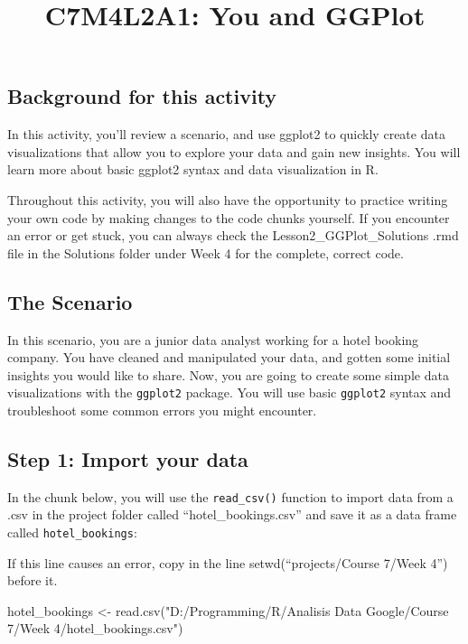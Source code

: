 \documentclass[
]{article}
\title{C7M4L2A1: You and GGPlot}
\author{}
\date{\vspace{-2.5em}}
\newenvironment{Shaded}{\begin{snugshade}}{\end{snugshade}}
\newcommand{\FunctionTok}[1]{\textcolor[rgb]{0.00,0.00,0.00}{#1}}
\newcommand{\NormalTok}[1]{#1}
\newcommand{\OtherTok}[1]{\textcolor[rgb]{0.56,0.35,0.01}{#1}}
\newcommand{\StringTok}[1]{\textcolor[rgb]{0.31,0.60,0.02}{#1}}
\begin{document}
\maketitle

\hypertarget{background-for-this-activity}{%
\subsection{Background for this
activity}\label{background-for-this-activity}}

In this activity, you'll review a scenario, and use ggplot2 to quickly
create data visualizations that allow you to explore your data and gain
new insights. You will learn more about basic ggplot2 syntax and data
visualization in R.

Throughout this activity, you will also have the opportunity to practice
writing your own code by making changes to the code chunks yourself. If
you encounter an error or get stuck, you can always check the
Lesson2\_GGPlot\_Solutions .rmd file in the Solutions folder under Week
4 for the complete, correct code.

\hypertarget{the-scenario}{%
\subsection{The Scenario}\label{the-scenario}}

In this scenario, you are a junior data analyst working for a hotel
booking company. You have cleaned and manipulated your data, and gotten
some initial insights you would like to share. Now, you are going to
create some simple data visualizations with the \texttt{ggplot2}
package. You will use basic \texttt{ggplot2} syntax and troubleshoot
some common errors you might encounter.

\hypertarget{step-1-import-your-data}{%
\subsection{Step 1: Import your data}\label{step-1-import-your-data}}

In the chunk below, you will use the \texttt{read\_csv()} function to
import data from a .csv in the project folder called
``hotel\_bookings.csv'' and save it as a data frame called
\texttt{hotel\_bookings}:

If this line causes an error, copy in the line setwd(``projects/Course
7/Week 4'') before it.

\begin{Shaded}
\begin{Highlighting}[]
\NormalTok{hotel\_bookings }\OtherTok{\textless{}{-}} \FunctionTok{read.csv}\NormalTok{(}\StringTok{"D:/Programming/R/Analisis Data Google/Course 7/Week 4/hotel\_bookings.csv"}\NormalTok{)}
\end{Highlighting}
\end{Shaded}
\end{document}
